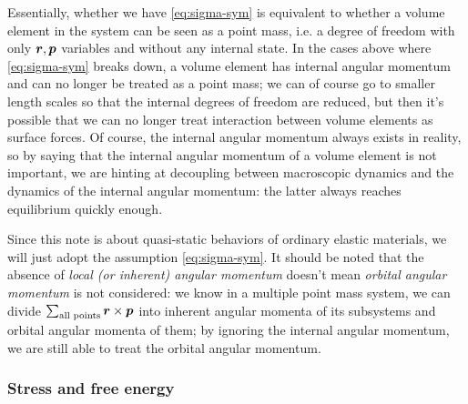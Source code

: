 \documentclass[hyperref, a4paper]{article}
\begin{document}
Essentially, whether we have \eqref{eq:sigma-sym} 
is equivalent to whether a volume element in the system 
can be seen as a point mass, 
i.e. a degree of freedom with only $\vb*{r}, \vb*{p}$ variables 
and without any internal state.
In the cases above where \eqref{eq:sigma-sym} breaks down, 
a volume element has internal angular momentum and 
can no longer be treated as a point mass; 
we can of course go to smaller length scales 
so that the internal degrees of freedom are reduced, 
but then it's possible that we can no longer treat 
interaction between volume elements as surface forces. 
Of course, the internal angular momentum always exists in reality,
so by saying that the internal angular momentum of a volume element is not important,
we are hinting at decoupling between 
macroscopic dynamics and the dynamics of the internal angular momentum:
the latter always reaches equilibrium quickly enough.

Since this note is about quasi-static behaviors of ordinary elastic materials,
we will just adopt the assumption \eqref{eq:sigma-sym}.
It should be noted that the absence of \emph{local (or inherent) angular momentum} 
doesn't mean \emph{orbital angular momentum} is not considered: 
we know in a multiple point mass system, 
we can divide $\sum_{\text{all points}} \vb*{r} \times \vb*{p}$
into inherent angular momenta of its subsystems 
and orbital angular momenta of them; 
by ignoring the internal angular momentum, 
we are still able to treat the orbital angular momentum.

\subsubsection{Stress and free energy}
\end{document}
